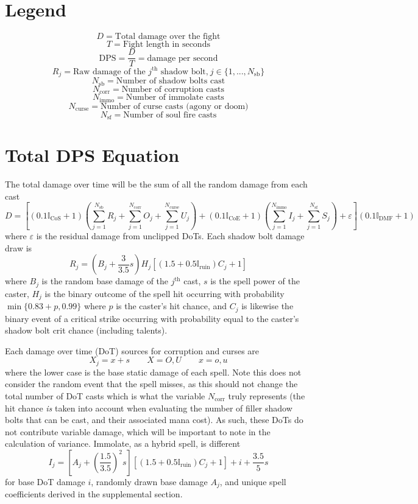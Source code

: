 
\section*{Legend}
$$
D = \text{Total damage over the fight}
$$
$$
T = \text{Fight length in seconds}
$$
$$
\text{DPS} = \frac{D}{T} = \text{damage per second}
$$
$$
R_j = \text{Raw damage of the $j^\text{th}$ shadow bolt,} \ j \in \{ 1, ..., N_\text{sb} \}
$$
$$
N_\text{sb} = \text{Number of shadow bolts cast}
$$
$$
N_\text{corr} = \text{Number of corruption casts}
$$
$$
N_\text{immo} = \text{Number of immolate casts}
$$
$$
N_\text{curse} = \text{Number of curse casts (agony or doom)}
$$
$$
N_\text{sf} = \text{Number of soul fire casts}
$$


\section*{Total DPS Equation}
%
The total damage over time will be the sum of all the random damage from each cast
%
\small
$$
D = \left[ (0.1 \mathbb{I}_{\text{CoS}} + 1) (\sum_{j=1}^{N_\text{sb}} R_j + \sum_{j=1}^{N_\text{corr}} O_j +
\sum_{j=1}^{N_\text{curse}} U_j) + (0.1 \mathbb{I}_{\text{CoE}} + 1) (\sum_{j=1}^{N_\text{immo}} I_j +
\sum_{j=1}^{N_\text{sf}} S_j) +
\varepsilon \right] (0.1 \mathbb{I}_{\text{DMF}} + 1)
$$
\normalsize
%
where $\varepsilon$ is the residual damage from unclipped DoTs. Each shadow bolt damage draw is
%
$$
R_j = (B_j + \frac{3}{3.5} s) H_j \left[ (1.5 + 0.5 \mathbb{I}_{\text{ruin}}) C_j + 1 \right]
$$
%
where $B_j$ is the random base damage of the $j^\text{th}$ cast, $s$ is the spell power of the caster, $H_j$ is the binary outcome of the spell hit occurring with probability $\min \{ 0.83 + p, 0.99 \}$ where $p$ is the caster's hit chance, and $C_j$ is likewise the binary event of a critical strike occurring with probability equal to the caster's shadow bolt crit chance (including talents).

Each damage over time (DoT) sources for corruption and curses are
%
$$
X_j = x + s \qquad X = O,U \qquad x = o,u
$$
%
where the lower case is the base static damage of each spell. Note this does not consider the random event that the spell misses, as this should not change the total number of DoT casts which is what the variable $N_\text{corr}$ truly represents (the hit chance \textit{is} taken into account when evaluating the number of filler shadow bolts that can be cast, and their associated mana cost). As such, these DoTs do not contribute variable damage, which will be important to note in the calculation of variance. Immolate, as a hybrid spell, is different
%
$$
I_j = \left[ A_j + (\frac{1.5}{3.5})^2 s \right] [(1.5 + 0.5 \mathbb{I}_{\text{ruin}}) C_j + 1] + i + \frac{3.5}{5} s
$$
%
for base DoT damage $i$, randomly drawn base damage $A_j$, and unique spell coefficients derived in the supplemental section.

